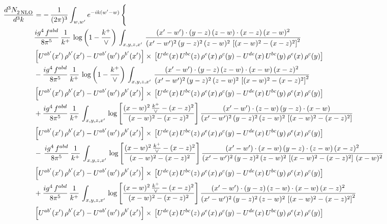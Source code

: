 \documentclass[9pt]{article}
\numberwithin{equation}{section}
\begin{document}
\begin{align}
   \frac{d^{3}N_{2\,\rm NLO}^{\rm}}{d^{3}k}  & =  -\,\frac{1}{(2\pi)^{3}}  \int_{w, w^\prime} e^{-ik(w^\prime-w)}\, \Bigg\{\notag \\ &  \frac{ig^{4}\, f^{abd}}{8\pi^{5}}\, \frac{1}{k^{+}}\,\log{\left(1-\frac{k^{+}}{\vee}\right)}\, \int_{x,y,z,x'}\,\frac{(x'-w')\cdot  (y-z)\, (z-w)\cdot (x-z)\, (x-w)^{2}}{(x'-w')^{2}\, (y-z)^{2}\, (z-w)^{2}\,\left[(x-w)^{2}-(x-z)^{2}\right]^{2}}\, \notag \\ & \left[U^{ab'}(x')\,\rho^{b'}(x')-U^{ab'}(w')\, \rho^{b'}(x')\right]\times\,\left[U^{de}(x)\,U^{bc}(z)\, \rho^{e}(x)\,\rho^{c}(y)-U^{de}(x)\,U^{bc}(y)\,\rho^{e}(x)\,\rho^{c}(y)\right] \notag \\ &   - \frac{ig^{4}\, f^{abd}}{8\pi^{5}}\, \frac{1}{k^{+}}\,\log{\left(1-\frac{k^{+}}{\vee}\right)}\, \int_{x,y,z,x'}\,\frac{(x'-w')\cdot  (y-z)\, (z-w)\cdot (x-w)\, (x-z)^{2}}{(x'-w')^{2}\, (y-z)^{2}\, (z-w)^{2}\,\left[(x-w)^{2}-(x-z)^{2}\right]^{2}}\, \notag \\ & \left[U^{ab'}(x')\,\rho^{b'}(x')-U^{ab'}(w')\, \rho^{b'}(x')\right]\times\,\left[U^{de}(x)\,U^{bc}(z)\, \rho^{e}(x)\,\rho^{c}(y)-U^{de}(x)\,U^{bc}(y)\,\rho^{e}(x)\,\rho^{c}(y)\right] \notag \\
&  + \frac{ig^{4}\, f^{abd}}{8\pi^{5}}\, \frac{1}{k^{+}}\, \int_{x,y,z,x'}\,\log{\left[\frac{(x-w)^{2}\,\frac{k^{+}}{\vee}-(x-z)^{2}}{(x-w)^{2}-(x-z)^{2}}\right]}\,\frac{(x'-w')\cdot (z-w)\, (y-z)\cdot (x-w)}{(x'-w')^{2}\, (y-z)^{2}\, (z-w)^{2}\,\left[(x-w)^{2}-(x-z)^{2}\right]}\, \notag \\ & \left[U^{ab'}(x')\,\rho^{b'}(x')-U^{ab'}(w')\, \rho^{b'}(x')\right]\times\,\left[U^{de}(x)\,U^{bc}(z)\, \rho^{e}(x)\,\rho^{c}(y)-U^{de}(x)\,U^{bc}(y)\,\rho^{e}(x)\,\rho^{c}(y)\right] \notag \\
& -\,\frac{ig^{4}\, f^{abd}}{8\pi^{5}}\, \frac{1}{k^{+}}\, \int_{x,y,z,x'}\,\log{\left[\frac{(x-w)^{2}\,\frac{k^{+}}{\vee}-(x-z)^{2}}{(x-w)^{2}-(x-z)^{2}}\right]}\,\frac{(x'-w')\cdot (x-w)\, (y-z)\cdot(z-w)\,(x-z)^{2}}{(x'-w')^{2}\, (y-z)^{2}\, (z-w)^{2}\,\left[(x-w)^{2}-(x-z)^{2}\right]\,(x-w)^{2}}\, \notag \\ & \left[U^{ab'}(x')\,\rho^{b'}(x')-U^{ab'}(w')\, \rho^{b'}(x')\right]\times\,\left[U^{de}(x)\,U^{bc}(z)\, \rho^{e}(x)\,\rho^{c}(y)-U^{de}(x)\,U^{bc}(y)\,\rho^{e}(x)\,\rho^{c}(y)\right] \notag \\
& +\frac{ig^{4}\, f^{abd}}{8\pi^{5}}\, \frac{1}{k^{+}}\, \int_{x,y,z,x'}\,\log{\left[\frac{(x-w)^{2}\,\frac{k^{+}}{\vee}-(x-z)^{2}}{(x-w)^{2}-(x-z)^{2}}\right]}\,\frac{(x'-w')\cdot  (y-z)\, (z-w)\cdot (x-w)\, (x-z)^{2}}{(x'-w')^{2}\, (y-z)^{2}\, (z-w)^{2}\,\left[(x-w)^{2}-(x-z)^{2}\right]^{2}}\, \notag \\ & \left[U^{ab'}(x')\,\rho^{b'}(x')-U^{ab'}(w')\, \rho^{b'}(x')\right]\times\,\left[U^{de}(x)\,U^{bc}(z)\, \rho^{e}(x)\,\rho^{c}(y)-U^{de}(x)\,U^{bc}(y)\,\rho^{e}(x)\,\rho^{c}(y)\right] \notag \\

\end{align}
\end{document}
